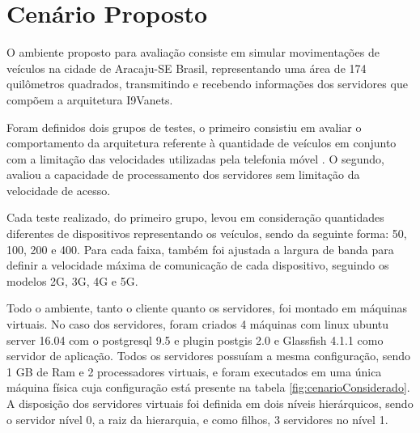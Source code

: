 \documentclass[
	12pt,				%
	oneside,			%
	a4paper,			%
	english,			%
	brazil				%
	]{abntex2ppgsi}
\begin{document}

\section{Cenário Proposto}

O ambiente proposto para avaliação consiste em simular movimentações de veículos na cidade de Aracaju-SE Brasil, representando uma área de 174 quilômetros quadrados, transmitindo e recebendo informações dos servidores que compõem a arquitetura I9Vanets. 

Foram definidos dois grupos de testes, o primeiro consistiu em avaliar o comportamento da arquitetura referente à quantidade de veículos em conjunto com a limitação das velocidades utilizadas pela telefonia móvel . O segundo, avaliou a capacidade de processamento dos servidores sem limitação da velocidade de acesso.

Cada teste realizado, do primeiro grupo, levou em consideração quantidades diferentes de dispositivos representando os veículos, sendo da seguinte forma: 50, 100, 200 e 400. Para cada faixa, também foi ajustada a largura de banda para definir a velocidade máxima de comunicação de cada dispositivo, seguindo os modelos 2G, 3G, 4G e 5G.

Todo o ambiente, tanto o cliente quanto os servidores, foi montado em máquinas virtuais. No caso dos servidores,  foram criados 4 máquinas com linux ubuntu server 16.04 com o postgresql 9.5 e plugin postgis 2.0 e Glassfish 4.1.1 como servidor de aplicação. Todos os servidores possuíam a mesma configuração, sendo 1 GB de Ram e 2 processadores virtuais, e foram executados em uma única máquina física cuja configuração está presente na tabela \ref{fig:cenarioConsiderado}. A disposição dos servidores virtuais foi definida em dois níveis hierárquicos, sendo o servidor nível 0, a raiz da hierarquia, e como filhos,  3 servidores no nível 1.
\end{document}
